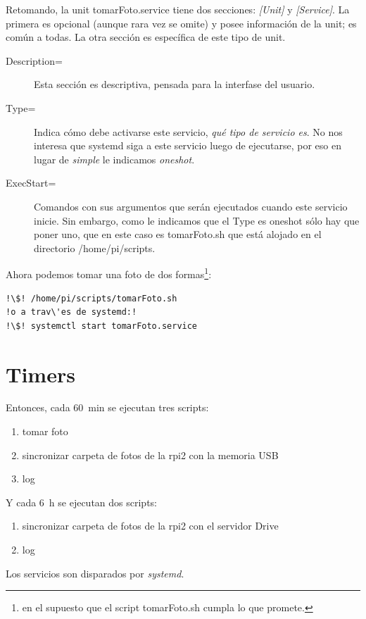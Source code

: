 \documentclass[10pt,a4paper]{article}
\begin{document}
Retomando, la unit tomarFoto.service tiene dos secciones: \emph{[Unit]} y \emph{[Service]}. La primera es opcional (aunque rara vez se omite) y posee informaci\'on de la unit; es com\'un a todas. La otra secci\'on es espec\'ifica de este tipo de unit. 

\begin{description}
    \item [Description=] Esta secci\'on es descriptiva, pensada para la interfase del usuario.
    \item [Type=] Indica c\'omo debe activarse este servicio, \emph{qu\'e tipo de servicio es}. No nos interesa que systemd siga a este servicio luego de ejecutarse, por eso en lugar de \emph{simple} le indicamos \emph{oneshot}.
    \item [ExecStart=] Comandos con sus argumentos que ser\'an ejecutados cuando este servicio inicie. Sin embargo, como le indicamos que el Type es oneshot s\'olo hay que poner uno, que en este caso es tomarFoto.sh que est\'a alojado en el directorio /home/pi/scripts.
\end{description}

Ahora podemos tomar una foto de dos formas\footnote{en el supuesto que el script tomarFoto.sh cumpla lo que promete.}:
\begin{lstlisting}
!\$! /home/pi/scripts/tomarFoto.sh
!o a trav\'es de systemd:!
!\$! systemctl start tomarFoto.service
\end{lstlisting}

\section{Timers}

Entonces, cada \SI{60}{min} se ejecutan tres scripts:
\begin{enumerate}
    \item tomar foto
    \item sincronizar carpeta de fotos de la rpi2 con la memoria USB
    \item log
\end{enumerate}

Y cada \SI{6}{h} se ejecutan dos scripts:
\begin{enumerate}
    \item sincronizar carpeta de fotos de la rpi2 con el servidor Drive
    \item log
\end{enumerate}

Los servicios son disparados por \emph{systemd}.
\end{document}
